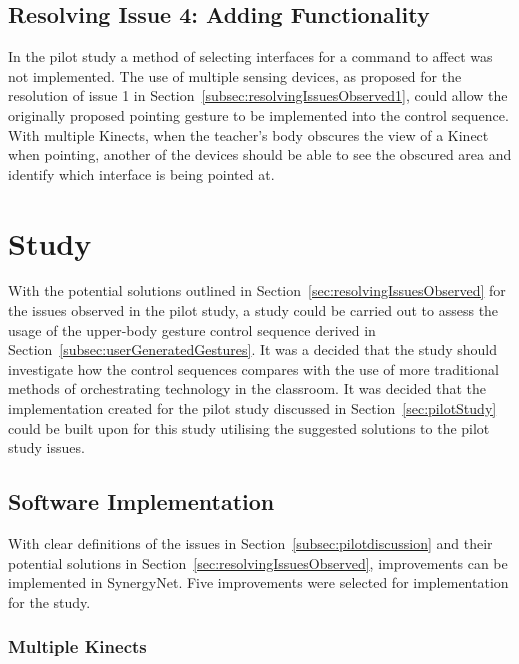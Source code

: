 \documentclass[link]{IWCOMP}
\begin{document}
\subsection{Resolving Issue 4: Adding Functionality}
\label{subsec:resolvingIssuesObserved4}

In the pilot study a method of selecting interfaces for a command to affect was not implemented.
The use of multiple sensing devices, as proposed for the resolution of issue 1 in Section~\ref{subsec:resolvingIssuesObserved1}, could allow the originally proposed pointing gesture to be implemented into the control sequence.
With multiple Kinects, when the teacher's body obscures the view of a Kinect when pointing, another of the devices should be able to see the obscured area and identify which interface is being pointed at.

\section{Study}
\label{sec:study}

With the potential solutions outlined in Section~\ref{sec:resolvingIssuesObserved} for the issues observed in the pilot study, a study could be carried out to assess the usage of the upper-body gesture control sequence derived in Section~\ref{subsec:userGeneratedGestures}.
It was a decided that the study should investigate how the control sequences compares with the use of more traditional methods of orchestrating technology in the classroom.
It was decided that the implementation created for the pilot study discussed in Section~\ref{sec:pilotStudy} could be built upon for this study utilising the suggested solutions to the pilot study issues.

\subsection{Software Implementation}
\label{subsec:studyImplementation}

With clear definitions of the issues in Section~\ref{subsec:pilotdiscussion} and their potential solutions in Section~\ref{sec:resolvingIssuesObserved}, improvements can be implemented in SynergyNet.
Five improvements were selected for implementation for the study.

\subsubsection{Multiple Kinects} 
\label{subsubsec:studyImplementationMultipleKinects}
\end{document}
